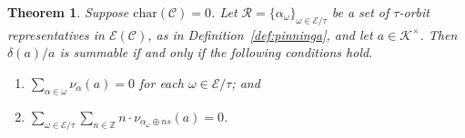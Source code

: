 \documentclass[preprint,12pt]{elsarticle}
\numberwithin{equation}{section} %
\theoremstyle{theorem}
\newtheorem{theorem}{Theorem}[section]
\theoremstyle{definition}
\newcommand{\Ca}{\mathcal{C}} %
\newcommand{\bk}{\mathcal{K}} %
\newcommand{\ec}{\mathcal{E}} %
\newcommand{\orbita}{{\ec/\tau}} %
\newcommand{\Z}{\mathbb{Z}} %
\begin{document}
    \begin{theorem}\label{thm:dlog-integrability-0} Suppose $\mathrm{char}(\Ca)=0$. Let $\mathcal{R}=\{\alpha_\omega\}_{\omega\in\orbita}$ be a set of \mbox{$\tau$-orbit} representatives in $\ec(\Ca)$, as in Definition~\ref{def:pinninga}, and let $a\in\bk^\times$. Then $\delta(a)/a$ is summable if and only if the following conditions hold.
        \begin{enumerate}
            \item $\displaystyle \sum_{\alpha\in\omega}\nu_\alpha(a)=0$ for each $\omega\in\orbita$; and
            \item $\displaystyle \sum_{\omega\in\orbita}\sum_{n\in\Z}n\cdot\nu_{\alpha_\omega\oplus ns}(a)=0$.
        \end{enumerate}
        \end{theorem}
\end{document}
